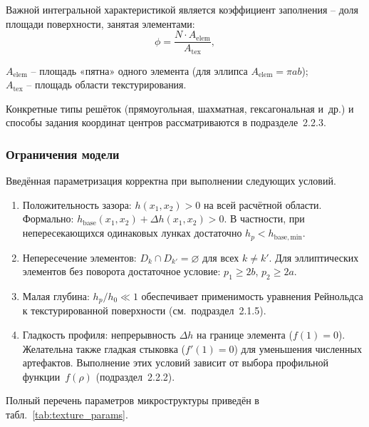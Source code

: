 Важной интегральной характеристикой является коэффициент заполнения --
доля площади поверхности, занятая элементами:
\begin{equation}
  \phi = \frac{N \cdot A_{\mathrm{elem}}}{A_{\mathrm{tex}}},
  \label{eq:fill_fraction}
\end{equation}
\begin{conditions}
$A_{\mathrm{elem}}$ -- площадь «пятна» одного элемента (для
эллипса $A_{\mathrm{elem}} = \pi a b$);\\
$A_{\mathrm{tex}}$ -- площадь области текстурирования.
\end{conditions}
Конкретные типы решёток (прямоугольная, шахматная, гексагональная
и~др.) и способы задания координат центров рассматриваются
в подразделе~2.2.3.


\subsubsection*{Ограничения модели}

Введённая параметризация корректна при выполнении следующих условий.
\begin{enumerate}
  \item Положительность зазора: $h(x_1, x_2) > 0$ на всей расчётной
        области. Формально:
        $h_{\mathrm{base}}(x_1, x_2) + \Delta h(x_1, x_2) > 0$.
        В частности, при непересекающихся одинаковых лунках достаточно
        $h_p < h_{\mathrm{base,min}}$.
  \item Непересечение элементов:
        $D_k \cap D_{k'} = \varnothing$ для всех $k \neq k'$.
        Для эллиптических элементов без поворота достаточное условие:
        $p_1 \geq 2b$, $p_2 \geq 2a$.
  \item Малая глубина: $h_p / h_0 \ll 1$ обеспечивает применимость
        уравнения Рейнольдса к текстурированной поверхности
        (см.\ подраздел~2.1.5).
  \item Гладкость профиля: непрерывность $\Delta h$ на границе
        элемента ($f(1) = 0$). Желательна также гладкая стыковка
        ($f'(1) = 0$) для уменьшения численных артефактов. Выполнение
        этих условий зависит от выбора профильной функции~$f(\rho)$
        (подраздел~2.2.2).
\end{enumerate}


Полный перечень параметров микроструктуры приведён в табл.~\ref{tab:texture_params}.

